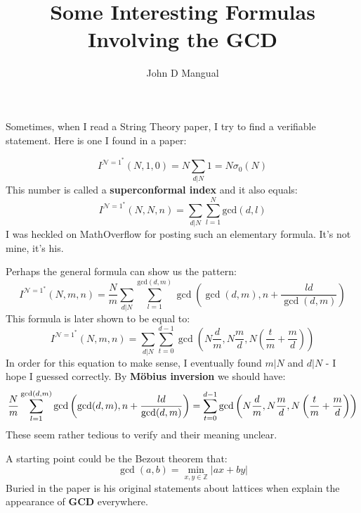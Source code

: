 \documentclass[12pt]{article}
\title{\textbf{ Some Interesting Formulas Involving the GCD }}
\author{John D Mangual}
\date{}
\begin{document}
\selectfont \fontsize{25}{30}\selectfont

\maketitle

Sometimes, when I read a String Theory paper, I try to find a verifiable statement.  Here is one I found in a paper:

$$ I^{\mathcal{N}=1^\ast}(N,1,0) = N \sum_{d| N} 1 = N \sigma_0(N) $$
This number is called a \textbf{superconformal index} and it also equals: 
$$ I^{\mathcal{N}=1^\ast}(N,N,n) =  \sum_{d| N} \sum_{l=1}^N \mathrm{gcd}(d,l ) $$
I was heckled on MathOverflow for posting such an elementary formula.  It's not mine, it's his.
\newpage

Perhaps the general formula can show us the pattern:
$$  I^{\mathcal{N}=1^\ast}(N,m,n) = \frac{N}{m} \sum_{d|N} \sum_{l=1}^{\mathrm{gcd}(d,m)}
\gcd\left( \gcd(d,m), n + \frac{ld}{\gcd(d,m)} \right)
$$
This formula is later shown to be equal to:
$$  I^{\mathcal{N}=1^\ast}(N,m,n) = 
 \sum_{d|N} \sum_{t=0}^{d-1} \gcd \left(N \frac{d}{m}, N \frac{m}{d}, N \left( \frac{t}{m} + \frac{m}{d} \right) \right)
$$
In order for this equation to make sense, I eventually found $m | N$ and $d | N$ - I hope I guessed correctly.  \newline \newline
By \textbf{M\"{o}bius inversion} we should have:
$$ \tiny \frac{N}{m}  \sum_{l=1}^{\mathrm{gcd}(d,m)}
\gcd\left( \gcd(d,m), n + \frac{ld}{\gcd(d,m)} \right)
= 
 \sum_{t=0}^{d-1} \gcd \left(N \frac{d}{m}, N \frac{m}{d}, N \left( \frac{t}{m} + \frac{m}{d} \right) \right)$$
These seem rather tedious to verify and their meaning unclear.

\newpage

A starting point could be the Bezout theorem that:
$$ \gcd(a,b) = \min_{x,y \in \mathbb{Z}} |ax + by |$$
Buried in the paper is his original statements about lattices when explain the appearance of \textbf{GCD} everywhere.

\newpage

\selectfont \fontsize{12}{10}\selectfont
\end{document}
